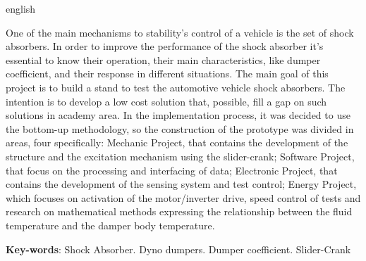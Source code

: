 \begin{resumo}[Abstract]
 \begin{otherlanguage*}{english}
 
One of the main mechanisms to stability’s control of a vehicle is the set of shock absorbers. In order to improve the performance of the shock absorber it’s essential to know their operation, their main characteristics, like dumper coefficient, and their response in different situations. The main goal of this project is to build a stand to test the automotive vehicle shock absorbers. The intention is to develop a low cost solution that, possible, fill a gap on such solutions in academy area. In the implementation process, it was decided to use the bottom-up methodology, so the construction of the prototype was divided in areas, four specifically: Mechanic Project, that contains the development of the structure and the excitation mechanism using the slider-crank; Software Project, that focus on the processing and interfacing of data; Electronic Project, that contains the development of the sensing system and test control; Energy Project, which focuses on activation of the motor/inverter drive, speed control of tests and research on mathematical methods expressing the relationship between the fluid temperature and the damper body temperature.


   \vspace{\onelineskip}
 
   \noindent 

\textbf{Key-words}: Shock Absorber. Dyno dumpers. Dumper coefficient. Slider-Crank

\end{otherlanguage*}
\end{resumo}